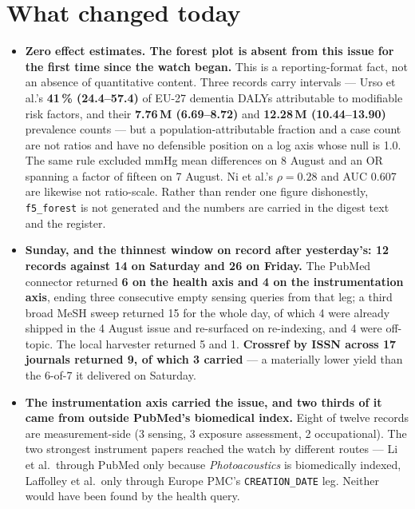 \documentclass[10pt]{article}
\begin{document}
\clearpage

\section*{\sffamily\bfseries\color{Deep}What changed today}
\vspace{-1.5mm}{\color{Amber}\rule{\linewidth}{1.1pt}}\vspace{2.5mm}

\footnotesize
\begin{itemize}
\item \textbf{Zero effect estimates. The forest plot is absent from this issue for the
first time since the watch began.} This is a reporting-format fact, not an absence of
quantitative content. Three records carry intervals --- Urso et al.'s
\textbf{41\,\% (24.4--57.4)} of EU-27 dementia DALYs attributable to modifiable risk
factors, and their \textbf{7.76\,M (6.69--8.72)} and \textbf{12.28\,M (10.44--13.90)}
prevalence counts --- but a population-attributable fraction and a case count are not
ratios and have no defensible position on a log axis whose null is 1.0. The same rule
excluded mmHg mean differences on 8 August and an OR spanning a factor of fifteen on
7 August. Ni et al.'s $\rho=0.28$ and AUC 0.607 are likewise not ratio-scale. Rather than
render one figure dishonestly, \texttt{f5\_forest} is not generated and the numbers are
carried in the digest text and the register.

\item \textbf{Sunday, and the thinnest window on record after yesterday's: 12 records
against 14 on Saturday and 26 on Friday.} The PubMed connector returned \textbf{6 on the
health axis and 4 on the instrumentation axis}, ending three consecutive empty sensing
queries from that leg; a third broad MeSH sweep returned 15 for the whole day, of which
4 were already shipped in the 4 August issue and re-surfaced on re-indexing, and 4 were
off-topic. The local harvester returned 5 and 1. \textbf{Crossref by ISSN across
17 journals returned 9, of which 3 carried} --- a materially lower yield than the
6-of-7 it delivered on Saturday.

\item \textbf{The instrumentation axis carried the issue, and two thirds of it came from
outside PubMed's biomedical index.} Eight of twelve records are measurement-side
(3 sensing, 3 exposure assessment, 2 occupational). The two strongest instrument papers
reached the watch by different routes --- Li et al.\ through PubMed only because
\textit{Photoacoustics} is biomedically indexed, Laffolley et al.\ only through Europe
PMC's \texttt{CREATION\_DATE} leg. Neither would have been found by the health query.


\end{itemize}
\end{document}
